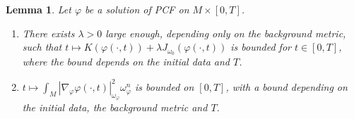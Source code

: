 \documentclass[11pt]{amsart}
\newtheorem{lem}{Lemma}[section]
\numberwithin{equation}{section}
\begin{document}
 \begin{lem}\label{Lem21}
 	Let $\varphi$ be a solution of PCF on $M\times [0,T]$.
	\begin{enumerate}
	\item There exists $\lambda>0$ large enough,  depending only on the background metric,  such that $t\mapsto K(\varphi(\cdot,t))+\lambda J_{\omega_0}(\varphi(\cdot,t))$ is bounded for $t\in [0,T]$,  where the bound depends on the initial data and  $T$.  
	\item $t\mapsto \int_M|\nabla_{\varphi}\varphi(\cdot,t)|^2_{\omega_{\varphi}}\omega_{\varphi}^n$ is bounded on $[0,T]$,  with a bound depending on the initial data,  the background metric and $T$.\\
	\end{enumerate}
 \end{lem}
\end{document}

